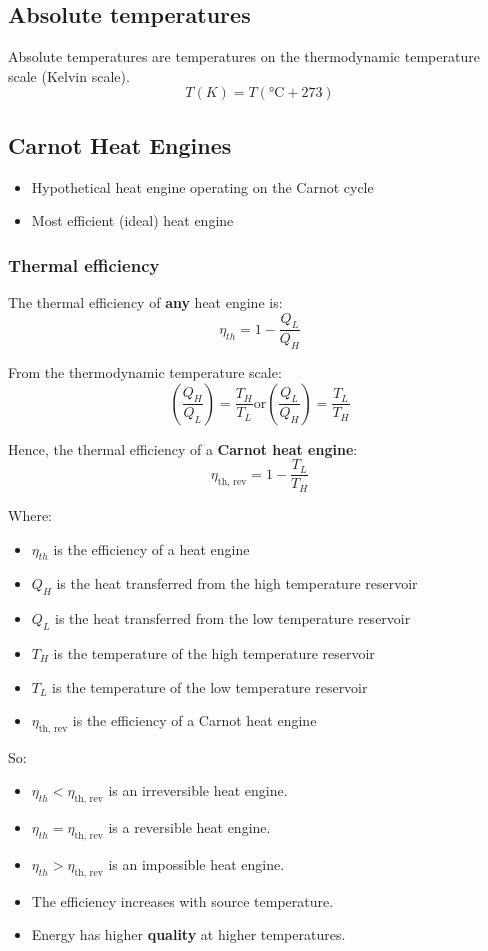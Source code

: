 \documentclass[11pt]{article}
\begin{document}
\subsection{Absolute temperatures}
\label{sec:orge855dfc}
Absolute temperatures are temperatures on the thermodynamic temperature scale (Kelvin scale).
\[T(\unit{K}) = T(\unit{\degreeCelsius} + 273)\]

\subsection{Carnot Heat Engines}
\label{sec:org67f4dfd}
\begin{itemize}
\item Hypothetical heat engine operating on the Carnot cycle
\item Most efficient (ideal) heat engine
\end{itemize}

 \newpage

\subsubsection{Thermal efficiency}
\label{sec:orgf4834b8}
The thermal efficiency of \textbf{any} heat engine is:
\[\eta_{th} = 1 - \frac{Q_L}{Q_H}\]

From the thermodynamic temperature scale:
\[\left(\frac{Q_H}{Q_L}\right) = \frac{T_H}{T_L} \text{or} \left(\frac{Q_L}{Q_H}\right) = \frac{T_L}{T_H}\]

Hence, the thermal efficiency of a \textbf{Carnot heat engine}:
\[\eta_{\text{th, rev}} = 1 - \frac{T_L}{T_H}\]

Where:
\begin{itemize}
\item \(\eta_{th}\) is the efficiency of a heat engine
\item \(Q_H\) is the heat transferred from the high temperature reservoir
\item \(Q_L\) is the heat transferred from the low temperature reservoir
\item \(T_H\) is the temperature of the high temperature reservoir
\item \(T_L\) is the temperature of the low temperature reservoir
\item \(\eta_{\text{th, rev}}\) is the efficiency of a Carnot heat engine
\end{itemize}

So:
\begin{itemize}
\item \(\eta_{th} < \eta_{\text{th, rev}}\) is an irreversible heat engine.
\item \(\eta_{th} = \eta_{\text{th, rev}}\) is a reversible heat engine.
\item \(\eta_{th} > \eta_{\text{th, rev}}\) is an impossible heat engine.
\item The efficiency increases with source temperature.
\item Energy has higher \textbf{quality} at higher temperatures.
\end{itemize}
\end{document}
